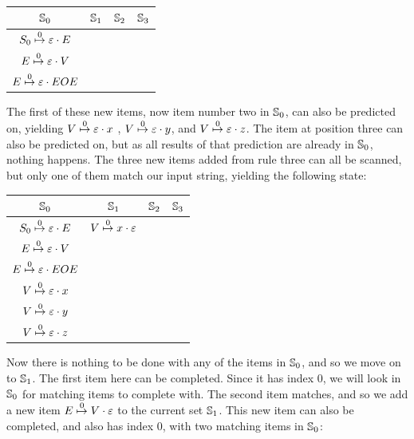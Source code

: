 		\begin{table}[h]
		\centering
		\begin{tabular}{|c|c|c|c|}
			\hline
			$\St{0}$ & $\St{1}$ & $\St{2}$ & $\St{3}$ \\
			\hline
			$\earley{S_0}{\varepsilon}{E}{0}$ & & & \\
			$\earley{E}{\varepsilon}{V}{0}$   & & & \\
			$\earley{E}{\varepsilon}{EOE}{0}$ & & & \\
			\hline
		\end{tabular}
		\end{table}

		The first of these new items, now item number two in $\St{0}$, can also
		be predicted on, yielding $\earley{V}{\varepsilon}{x}{0}$ ,
		$\earley{V}{\varepsilon}{y}{0}$, and $\earley{V}{\varepsilon}{z}{0}$.
		The item at position three can also be predicted on, but as all results
		of that prediction are already in $\St{0}$, nothing happens. The three
		new items added from rule three can all be scanned, but only one of
		them match our input string, yielding the following state:

		\begin{table}[h]
		\centering
		\begin{tabular}{|c|c|c|c|}
			\hline
			$\St{0}$                          & $\St{1}$ & $\St{2}$ & $\St{3}$ \\
			\hline
			$\earley{S_0}{\varepsilon}{E}{0}$ & $\earley{V}{x}{\varepsilon}{0}$ & &\\
			$\earley{E}{\varepsilon}{V}{0}$   & & & \\
			$\earley{E}{\varepsilon}{EOE}{0}$ & & & \\
			$\earley{V}{\varepsilon}{x}{0}$   & & & \\
			$\earley{V}{\varepsilon}{y}{0}$   & & & \\
			$\earley{V}{\varepsilon}{z}{0}$   & & & \\
			\hline
		\end{tabular}
		\end{table}

		Now there is nothing to be done with any of the items in $\St{0}$, and
		so we move on to $\St{1}$. The first item here can be completed. Since
		it has index $0$, we will look in $\St{0}$ for matching items to
		complete with. The second item matches, and so we add a new item
		$\earley{E}{V}{\varepsilon}{0}$ to the current set $\St{1}$. This new
		item can also be completed, and also has index $0$, with two matching
		items in $\St{0}$:

